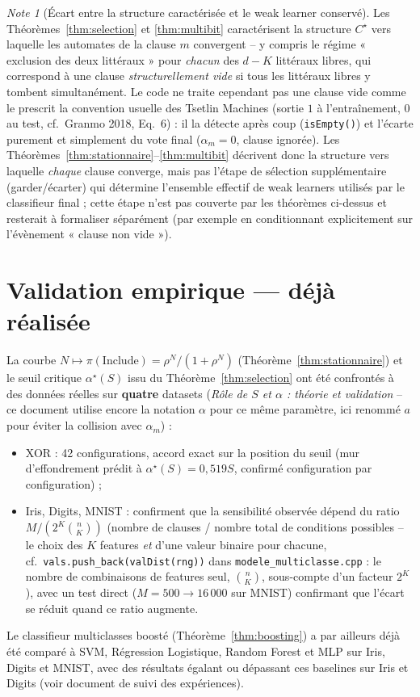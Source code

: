 \documentclass[12pt,a4paper]{article}
\theoremstyle{remark}
\newtheorem{note}{Note}[section]
\newcommand{\Inc}{\ensuremath{\mathrm{Include}}}
\begin{document}
\begin{note}[Écart entre la structure caractérisée et le weak learner conservé]
Les Théorèmes~\ref{thm:selection} et \ref{thm:multibit} caractérisent la
structure $C^\star$ vers laquelle les automates de la clause $m$
convergent -- y compris le régime « exclusion des deux littéraux » pour
\emph{chacun} des $d-K$ littéraux libres, qui correspond à une clause
\emph{structurellement vide} si tous les littéraux libres y tombent
simultanément. Le code ne traite cependant pas une clause vide comme le
prescrit la convention usuelle des Tsetlin Machines (sortie $1$ à
l'entraînement, $0$ au test, cf.\ Granmo 2018, Eq.~6) : il la détecte après
coup (\texttt{isEmpty()}) et l'écarte purement et simplement du vote final
($\alpha_m=0$, clause ignorée). Les Théorèmes~\ref{thm:stationnaire}--\ref{thm:multibit}
décrivent donc la structure vers laquelle \emph{chaque} clause converge, mais
pas l'étape de sélection supplémentaire (garder/écarter) qui détermine
l'ensemble effectif de weak learners utilisés par le classifieur final ; cette
étape n'est pas couverte par les théorèmes ci-dessus et resterait à formaliser
séparément (par exemple en conditionnant explicitement sur l'évènement
« clause non vide »).
\end{note}

\section{Validation empirique --- déjà réalisée}\label{sec:validation}

La courbe $N\mapsto\pi(\Inc)=\rho^N/(1+\rho^N)$ (Théorème~\ref{thm:stationnaire})
et le seuil critique $\alpha^\star(S)$ issu du Théorème~\ref{thm:selection} ont
été confrontés à des données réelles sur \textbf{quatre} datasets
(\textit{Rôle de $S$ et $\alpha$ : théorie et validation} -- ce document utilise
encore la notation $\alpha$ pour ce même paramètre, ici renommé $a$ pour éviter
la collision avec $\alpha_m$) :
\begin{itemize}
  \item XOR : 42 configurations, accord exact sur la position du seuil (mur
  d'effondrement prédit à $\alpha^\star(S)=0{,}519S$, confirmé configuration par
  configuration) ;
  \item Iris, Digits, MNIST : confirment que la sensibilité observée dépend du
  ratio $M/(2^K\binom{n}{K})$ (nombre de clauses / nombre total de
  conditions possibles -- le choix des $K$ features \emph{et} d'une valeur
  binaire pour chacune, cf.\ \texttt{vals.push\_back(valDist(rng))} dans
  \texttt{modele\_multiclasse.cpp} : le nombre de combinaisons de features
  seul, $\binom{n}{K}$, sous-compte d'un facteur $2^K$), avec un test direct
  ($M{=}500\to16\,000$ sur MNIST) confirmant que l'écart se réduit quand ce
  ratio augmente.
\end{itemize}
Le classifieur multiclasses boosté (Théorème~\ref{thm:boosting}) a par ailleurs
déjà été comparé à SVM, Régression Logistique, Random Forest et MLP sur Iris,
Digits et MNIST, avec des résultats égalant ou dépassant ces baselines sur
Iris et Digits (voir document de suivi des expériences).
\end{document}
